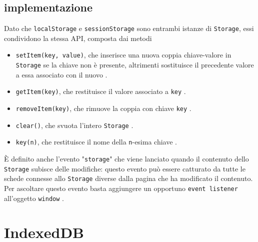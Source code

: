 \documentclass[a4paper, 12pt, twoside, openright]{book}
\begin{document}
\subsection{implementazione}
Dato che \texttt{localStorage} e \texttt{sessionStorage} sono entrambi istanze di \texttt{Storage}, essi condividono la stessa API, composta dai metodi
\begin{itemize}
\item\texttt{setItem(key, value)}, che inserisce una nuova coppia chiave-valore in \texttt{Storage} se la chiave non è presente, altrimenti sostituisce il precedente valore a essa associato con il nuovo \cite{MDN_Web_docs:localStorage}.
\item\texttt{getItem(key)}, che restituisce il valore associato a \texttt{key} \cite{MDN_Web_docs:localStorage}.
\item\texttt{removeItem(key)}, che rimuove la coppia con chiave \texttt{key} \cite{MDN_Web_docs:localStorage}.
\item\texttt{clear()}, che svuota l'intero \texttt{Storage} \cite{MDN_Web_docs:localStorage}.
\item\texttt{key(n)}, che restituisce il nome della \texttt{n}-esima chiave \cite{MDN_Web_docs:localStorage}. 
\end{itemize}
È definito anche l'evento "\texttt{storage}" che viene lanciato quando il contenuto dello \texttt{Storage} subisce delle modifiche: questo evento può essere catturato da tutte le schede connesse allo \texttt{Storage} diverse dalla pagina che ha modificato il contenuto. Per ascoltare questo evento basta aggiungere un opportuno \texttt{event listener} all'oggetto \texttt{window} \cite{MDN_Web_docs:storage_API}.

\section{IndexedDB}

\backmatter

\begingroup %
  \makeatletter
  \let\ps@plain\ps@empty
  \makeatother
  
\endgroup
\end{document}
